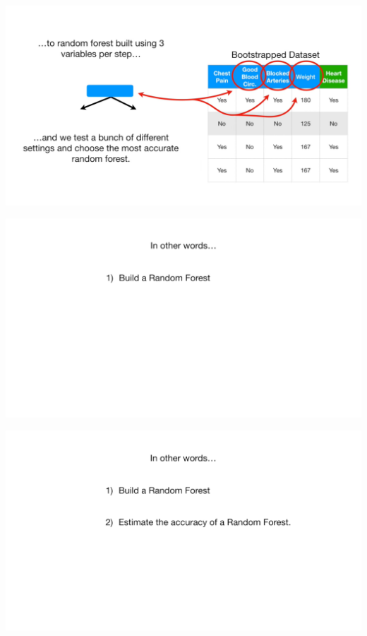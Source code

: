 \documentclass[
  ignorenonframetext,
]{beamer}
\begin{document}
\begin{frame}{}
\protect\hypertarget{section-92}{}
\includegraphics{images/r93.png}
\end{frame}

\begin{frame}{}
\protect\hypertarget{section-93}{}
\includegraphics{images/r94.png}
\end{frame}

\begin{frame}{}
\protect\hypertarget{section-94}{}
\includegraphics{images/r95.png}
\end{frame}
\end{document}
